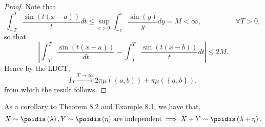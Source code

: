 \documentclass[stat901]{subfiles}
\begin{document}
\begin{proof}
        Note that
        \begin{equation*}
            \int^{T}_{-T} \frac{\sin\left( t\left( x-a \right) \right)}{t}dt \leq \sup_{c>0} \int^{c}_{-c} \frac{\sin\left( y \right)}{y} dy = M < \infty, \hspace{2cm}\forall T>0,
        \end{equation*}
        so that
        \begin{equation*}
            \left| \int^{T}_{-T} \frac{\sin\left( t\left( x-a \right) \right)}{dt} - \int^{T}_{-T} \frac{\sin\left( t\left( x-b \right) \right)}{t}dt \right| \leq 2M.
        \end{equation*}
        Hence by the LDCT,
        \begin{equation*}
            I_T \overset{T\to\infty}{\to} 2\pi\mu\left( \left( a,b \right) \right) + \pi\mu\left( \left\lbrace a,b \right\rbrace \right),
        \end{equation*}
        from which the result follows.
    \end{proof}

    \np As a corollary to Theorem 8.2 and Example 8.1, we have that,
    \begin{equation*}
        \text{$X\sim\poidis\left( \lambda \right),Y\sim\poidis\left( \eta \right)$ are independent} \implies X+Y\sim\poidis\left( \lambda+\eta \right).
    \end{equation*}
    
\end{document}
